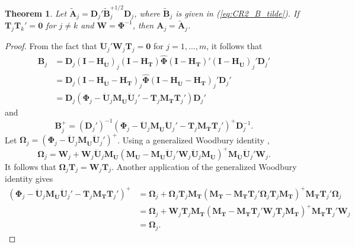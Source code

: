 \documentclass[12pt]{article}
\newtheorem{thm}{Theorem}
\newcommand{\bm}{\mathbf}
\newcommand{\bs}{\boldsymbol}
\begin{document}
\begin{thm}
\label{thm:absorb}
Let $\bm{\tilde{A}}_j = \bm{D}_j'\bm{\tilde{B}}_j^{+1/2} \bm{D}_j$, where $\bm{\tilde{B}}_j$ is given in (\ref{eq:CR2_B_tilde}). If $\bm{T}_j \bm{T}_k' = \bm{0}$ for $j \neq k$ and $\bm{W} = \bs\Phi^{-1}$, then $\bm{A}_j = \bm{\tilde{A}}_j$. 
\end{thm}

\begin{proof}
From the fact that $\bm{\ddot{U}}_j'\bm{W}_j\bm{T}_j = \bm{0}$ for $j = 1,...,m$, it follows that \begin{align*}
\bm{B}_j &= \bm{D}_j \left(\bm{I} - \bm{H_{\ddot{U}}}\right)_j \left(\bm{I} - \bm{H_T}\right) \hat{\bs\Phi} \left(\bm{I} - \bm{H_T}\right)' \left(\bm{I} - \bm{H_{\ddot{U}}}\right)_j' \bm{D}_j'\\
&= \bm{D}_j \left(\bm{I} - \bm{H_{\ddot{U}}} - \bm{H_T}\right)_j \hat{\bs\Phi} \left(\bm{I} - \bm{H_{\ddot{U}}} - \bm{H_T}\right)_j' \bm{D}_j' \\
&= \bm{D}_j \left(\bs\Phi_j - \bm{\ddot{U}}_j \bm{M_{\ddot{U}}}\bm{\ddot{U}}_j' - \bm{T}_j \bm{M_T}\bm{T}_j'\right)\bm{D}_j'
\end{align*}
and 
\begin{equation}
\label{eq:B_j_inverse}
\bm{B}_j^+ = \left(\bm{D}_j'\right)^{-1} \left(\bs\Phi_j - \bm{\ddot{U}}_j \bm{M_{\ddot{U}}}\bm{\ddot{U}}_j' - \bm{T}_j \bm{M_T}\bm{T}_j'\right)^+ \bm{D}_j^{-1}.
\end{equation}
Let $\bs\Omega_j = \left(\bs\Phi_j - \bm{\ddot{U}}_j \bm{M_{\ddot{U}}}\bm{\ddot{U}}_j'\right)^+$.
Using a generalized Woodbury identity \citep{Henderson1981on}, \[
\bs\Omega_j = \bm{W}_j + \bm{W}_j \bm{\ddot{U}}_j \bm{M_{\ddot{U}}}\left(\bm{M_{\ddot{U}}} - \bm{M_{\ddot{U}}} \bm{\ddot{U}}_j' \bm{W}_j \bm{\ddot{U}}_j \bm{M_{\ddot{U}}}\right)^+ \bm{M_{\ddot{U}}}\bm{\ddot{U}}_j'\bm{W}_j. \]
It follows that $\bs\Omega_j \bm{T}_j = \bm{W}_j \bm{T}_j$. 
Another application of the generalized Woodbury identity gives 
\begin{align*}
\left(\bs\Phi_j - \bm{\ddot{U}}_j \bm{M_{\ddot{U}}}\bm{\ddot{U}}_j' - \bm{T}_j \bm{M_T}\bm{T}_j'\right)^+ &= \bs\Omega_j + \bs\Omega_j \bm{T}_j \bm{M_T}\left(\bm{M_T} - \bm{M_T}\bm{T}_j' \bs\Omega_j \bm{T}_j \bm{M_T}\right)^+ \bm{M_T} \bm{T}_j' \bs\Omega_j \\
&= \bs\Omega_j + \bm{W}_j \bm{T}_j \bm{M_T}\left(\bm{M_T} - \bm{M_T}\bm{T}_j' \bm{W}_j \bm{T}_j\bm{M_T}\right)^+ \bm{M_T} \bm{T}_j' \bm{W}_j \\
&= \bs\Omega_j.
\end{align*}

\end{proof}
\end{document}
